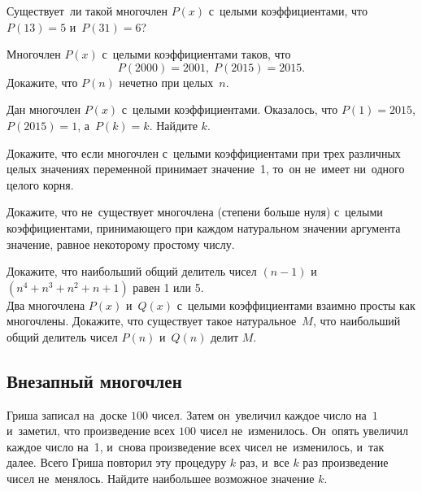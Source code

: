\begin{problems}

\item
Существует~ли такой многочлен $P(x)$ с~целыми коэффициентами, что
$P(13) = 5$ и~$P(31) = 6$?

\item
Многочлен $P(x)$ с~целыми коэффициентами таков, что
\[
    P(2000) = 2001
,\;
    P(2015) = 2015
.\]
Докажите, что $P(n)$ нечетно при целых~$n$.

\item
Дан многочлен $P(x)$ с~целыми коэффициентами.
Оказалось, что $P(1) = 2015$,  $P(2015) = 1$, а~$P(k) = k$.
Найдите $k$.

\item
Докажите, что если многочлен с~целыми коэффициентами при трех различных целых
значениях переменной принимает значение~1, то~он не~имеет ни~одного целого
корня.

\item
Докажите, что не~существует многочлена (степени больше нуля) с~целыми
коэффициентами, принимающего при каждом натуральном значении аргумента
значение, равное некоторому простому числу.

\item
\sp
Докажите, что наибольший общий делитель чисел $(n - 1)$
и~$(n^4 + n^3 + n^2 + n + 1)$ равен 1 или 5.
\\
\sp
Два многочлена $P(x)$ и~$Q(x)$ с~целыми коэффициентами взаимно просты как
многочлены.
Докажите, что существует такое натуральное~$M$, что наибольший общий делитель
чисел $P(n)$ и~$Q(n)$ делит $M$.

\end{problems}

\subsection*{Внезапный многочлен}

\begin{problems}

\item
Гриша записал на~доске $100$ чисел.
Затем он~увеличил каждое число на~$1$ и~заметил, что произведение всех
$100$ чисел не~изменилось.
Он~опять увеличил каждое число на~1, и~снова произведение всех чисел
не~изменилось, и~так далее.
Всего Гриша повторил эту процедуру $k$ раз, и~все $k$ раз произведение чисел
не~менялось.
Найдите наибольшее возможное значение $k$.

\end{problems}

